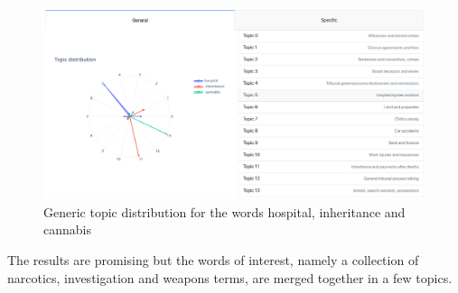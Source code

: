 \begin{figure}
  \begin{center}
    \includegraphics[width=\textwidth]{images/topic1.png}
    \caption{Generic topic distribution for the words hospital, inheritance and cannabis} \label{figt1}
  \end{center}
\end{figure}

The results are promising but the words of interest, namely a collection 
of narcotics, investigation and weapons terms, are merged together in a few topics.

